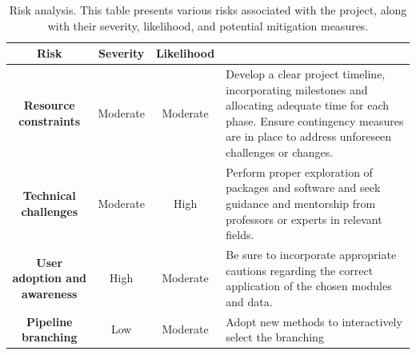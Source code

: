 \documentclass[ENG, BIB]{TFUOC}%
\begin{document}
\begin{table}[!h]
    \centering
    \begin{tabular}{|c|c|c|p{6cm}|}
        \hline
        \rowcolor[HTML]{999999}
        {\color[HTML]{FFFFFF} \textbf{Risk}}       &
        {\color[HTML]{FFFFFF} \textbf{Severity}}   &
        {\color[HTML]{FFFFFF} \textbf{Likelihood}} &
        \multicolumn{1}{c|}{\cellcolor[HTML]{999999}{\color[HTML]{FFFFFF} \textbf{Mitigation}}}                                                                                                       \\ \hline
        \textbf{Resource constraints}              &
        \cellcolor[HTML]{FFE599}Moderate           &
        \cellcolor[HTML]{FFE599}Moderate           &
        Develop a clear project timeline, incorporating milestones and allocating adequate time for each phase. Ensure contingency measures are in place to address unforeseen challenges or changes. \\ \hline
        \textbf{Technical challenges}              &
        \cellcolor[HTML]{FFE599}Moderate           &
        \cellcolor[HTML]{EA9999}High               &
        Perform proper exploration of packages and software and seek guidance and mentorship from professors or experts in relevant fields.                                                           \\ \hline
        \textbf{User adoption and awareness}       &
        \cellcolor[HTML]{EA9999}High               &
        \cellcolor[HTML]{FFE599}Moderate           &
        Be sure to incorporate appropriate cautions regarding the correct application of the chosen modules and data.                                                                                 \\ \hline
        \textbf{Pipeline branching}                &
        \cellcolor[HTML]{B6D7A8}Low                &
        \cellcolor[HTML]{FFE599}Moderate           &
        Adopt new methods to interactively select the branching                                                                                                                                       \\ \hline
    \end{tabular}
    \caption{Risk analysis. This table presents various risks associated with the project, along with
        their severity, likelihood, and potential mitigation measures.}
    \label{tab:risk-analysis}
\end{table}
\end{document}

